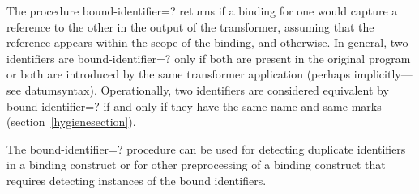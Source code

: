 \begin{entry}{%
}

The procedure {\cf bound-\linebreak[0]identifier=?} returns \schtrue{} if a
binding for one would capture a reference to the other in the output of
the transformer, assuming that the reference appears within the scope of
the binding, and \schfalse{} otherwise.
In general, two identifiers are {\cf bound-identifier=?} only if
both are present in the original program or both are introduced by the
same transformer application
(perhaps implicitly---see {\cf datum\coerce{}syntax}).
Operationally, two identifiers are
considered equivalent by {\cf bound-identifier=?} if and only if they
have the same name and same marks (section~\ref{hygienesection}).

The {\cf bound-identifier=?} procedure can be used for detecting
duplicate identifiers in a binding construct or for other
preprocessing of a binding construct that requires detecting instances
of the bound identifiers.
\end{entry}

